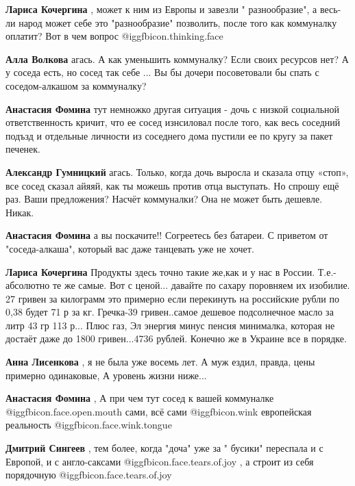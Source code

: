 \begin{itemize}
\begin{itemize}
\textbf{Лариса Кочергина} , может к ним из Европы и завезли " разнообразие", а весь- ли народ может себе это "разнообразие" позволить, после того как коммуналку оплатит? Вот в чем вопрос @igg{fbicon.thinking.face} 

\textbf{Алла Волкова} агась. А как уменьшить коммуналку? Если своих ресурсов нет? А у соседа есть, но сосед так себе ... Вы бы дочери посоветовали бы спать с соседом-алкашом за коммуналку?

\textbf{Анастасия Фомина} тут немножко другая ситуация - дочь с низкой социальной ответственность кричит, что ее сосед изнсиловал после того, как весь соседний подъзд и отдельные личности из соседнего дома пустили ее по кругу за пакет печенек.

\textbf{Александр Гумницкий} агась. Только, когда дочь выросла и сказала отцу «стоп», все сосед сказал айяяй, как ты можешь против отца выступать. Но спрошу ещё раз. Ваши предложения? Насчёт коммуналки? Она не может быть дешевле. Никак.

\textbf{Анастасия Фомина} а вы поскачите!! Согреетесь без батареи. С приветом от "соседа-алкаша", который вас даже танцевать уже не хочет.

\textbf{Лариса Кочергина} Продукты здесь точно такие же,как и у нас в России. Т.е.- абсолютно те же самые. Вот с ценой... давайте по сахару поровняем их изобилие. 27 гривен за килограмм это примерно если перекинуть на российские рубли по 0,38 будет 71 р за кг. Гречка-39 гривен..самое дешевое подсолнечное масло за литр 43 гр 113 р... Плюс газ, Эл энергия минус пенсия минималка, которая не достаёт даже до 1800 гривен...4736 рублей. Конечно же в Украине все в порядке.


\textbf{Анна Лисенкова} , я не была уже восемь лет. А муж ездил, правда, цены примерно одинаковые, А уровень жизни ниже...

\textbf{Анастасия Фомина} , А при чем тут сосед к вашей коммуналке  @igg{fbicon.face.open.mouth}  сами, всё сами @igg{fbicon.wink}  европейская реальность @igg{fbicon.face.wink.tongue} 

\textbf{Дмитрий Сингеев} , тем более, когда "доча" уже за " бусики" переспала и с Европой, и с англо-саксами @igg{fbicon.face.tears.of.joy} , а строит из себя порядочную @igg{fbicon.face.tears.of.joy} 


\end{itemize}
\end{itemize}
